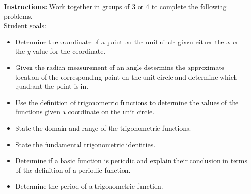 



\noindent \textbf{Instructions:}  Work together in groups of  3 or 4 to complete the following problems.\\

Student goals:
\begin{itemize}
\item Determine the coordinate of a point on the unit circle given
  either the $x$ or the $y$ value for the coordinate.
\item Given the radian measurement of an angle determine the
  approximate location of the corresponding point on the unit circle
  and determine which quadrant the point is in.
\item Use the definition of trigonometric functions to determine the
  values of the functions given a coordinate on the unit circle.
\item State the domain and range of the trigonometric functions.
\item State the fundamental trigonometric identities.
\item Determine if a basic function is periodic and explain their
  conclusion in terms of the definition of a periodic function.
\item Determine the period of a trigonometric function.
\end{itemize}



